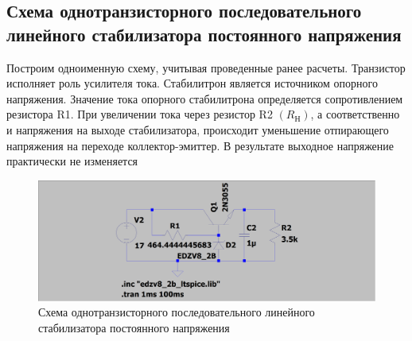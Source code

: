 \documentclass[a4paper, 12pt]{article}
\begin{document}
    \subsection{Схема однотранзисторного последовательного линейного стабилизатора постоянного напряжения}
    Построим одноименную схему, учитывая проведенные ранее расчеты.
    Транзистор исполняет роль усилителя тока. Стабилитрон является источником опорного напряжения.
    Значение тока опорного стабилитрона определяется сопротивлением резистора R1. При увеличении тока
    через резистор R2 $(R_\text{Н})$, а соответственно и напряжения на выходе стабилизатора,
    происходит уменьшение отпирающего напряжения на переходе коллектор-эмиттер.
    В результате выходное напряжение практически не изменяется
    \begin{figure}[H]
        \centering
        \includegraphics[scale=0.22]{2task_scheme_AC.png}
        \captionsetup{skip=0pt}
        \caption{Схема однотранзисторного последовательного линейного стабилизатора постоянного напряжения}
        \label{fig:2task_scheme_AC}
    \end{figure}
\end{document}
